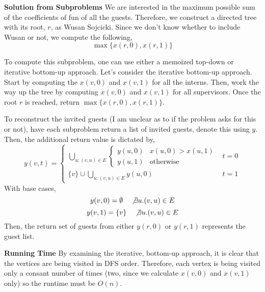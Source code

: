 \documentclass[12pt,twoside]{article}
\begin{document}
\begin{problems}
{\bf Solution from Subproblems} We are interested in the maximum possible sum
of the coefficients of fun of all the guests. Therefore, we construct a
directed tree with its root, $r$, as Wusan Sojcicki. Since we don't know
whether to include Wusan or not, we compute the following,
$$ \max\{x(r, 0), x(r, 1)\} $$

To compute this subproblem, one can use either a memoized top-down or
iterative bottom-up approach. Let's consider the iterative bottom-up
approach. Start by computing the $x(v, 0)$ and $x(v, 1)$ for all the interns.
Then, work the way up the tree by computing $x(v, 0)$ and $x(v, 1)$ for all
supervisors. Once the root $r$ is reached, return $\max \{ x(r, 0), x(r, 1)
\}$.

To reconstruct the invited guests (I am unclear as to if the problem asks for
this or not), have each subproblem return a list of invited guests, denote
this using $y$. Then, the additional return value is dictated by,
$$ y(v, t) = \begin{cases}
  \bigcup_{u : (v, u) \in E} \begin{cases}
    y(u, 0) & x(u, 0) > x(u, 1) \\
    y(u, 1) & \mathrm{otherwise}
  \end{cases} & t = 0 \\
  \{v\} \cup \bigcup_{u : (v, u) \in E} y(u, 0) & t = 1
\end{cases} $$
With base cases,
$$ y(v, 0) = \emptyset \quad \not\exists u.(v, u) \in E $$
$$ y(v, 1) = \{v\} \quad \not\exists u.(v, u) \in E $$
Then, the return set of guests from either $y(r, 0)$ or $y(r, 1)$ represents
the guest list.

{\bf Running Time} By examining the iterative, bottom-up approach, it is
clear that the vertices are being visited in DFS order. Therefore, each
vertex is being visited only a consant number of times (two, since we
calculate $x(v, 0)$ and $x(v, 1)$ only) so the runtime must be $O(n)$.

\end{problems}
\end{document}
